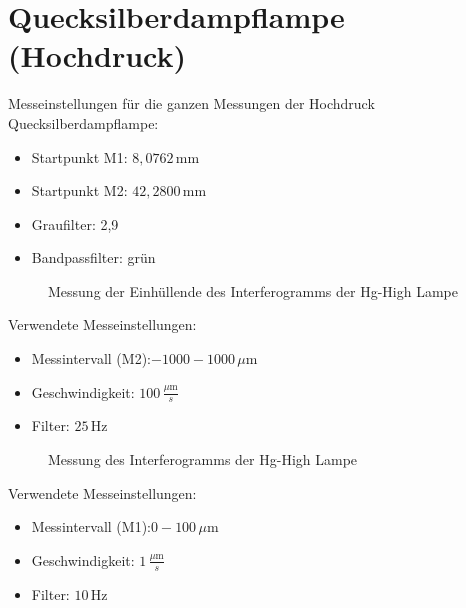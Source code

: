 \section{Quecksilberdampflampe (Hochdruck)}
Messeinstellungen für die ganzen Messungen der Hochdruck Quecksilberdampflampe:
\begin{itemize}
    \item Startpunkt M1: $8,0762\,\text{mm}$
    \item Startpunkt M2: $42,2800\,\text{mm}$
    \item Graufilter: 2,9
    \item Bandpassfilter: grün
\end{itemize}
\begin{figure}[h]
    \centering\scalebox{1.2}{}
    \caption{Messung der Einhüllende des Interferogramms der Hg-High Lampe}
\end{figure}
Verwendete Messeinstellungen:
\begin{itemize}
    \item Messintervall (M2):$-1000-1000\,\mu\text{m}$
    \item Geschwindigkeit: $100\,\frac{\mu\text{m}}{s}$
    \item Filter: $25\,\text{Hz}$
\end{itemize}\newpage
\begin{figure}[h]
    \centering\scalebox{1.2}{}
    \caption{Messung des Interferogramms der Hg-High Lampe}
\end{figure}
Verwendete Messeinstellungen:
\begin{itemize}
    \item Messintervall (M1):$0-100\,\mu\text{m}$
    \item Geschwindigkeit: $1\,\frac{\mu\text{m}}{s}$
    \item Filter: $10\,\text{Hz}$
\end{itemize}\newpage
